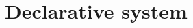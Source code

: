 \documentclass[a4,natbib=false]{article}
\begin{document}
\section{Declarative system}
\ottdefnsDe{}




\end{document}
